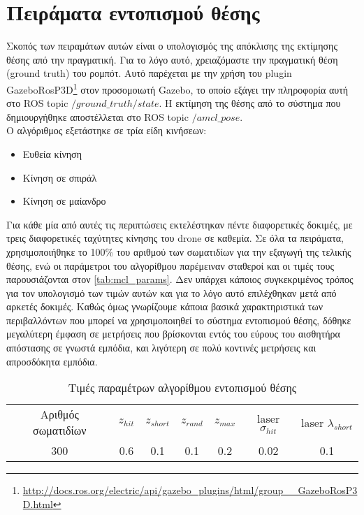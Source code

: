 \section{Πειράματα εντοπισμού θέσης}
\label{section:localization_tests}

Σκοπός των πειραμάτων αυτών είναι ο υπολογισμός της απόκλισης της εκτίμησης θέσης από την πραγματική. Για το λόγο αυτό, χρειαζόμαστε την πραγματική θέση (ground truth) του ρομπότ. Αυτό παρέχεται με την χρήση του plugin GazeboRosP3D\footnote{\href{http://docs.ros.org/electric/api/gazebo\_plugins/html/group\_\_GazeboRosP3D.html}{http://docs.ros.org/electric/api/gazebo\_plugins/html/group\_\_GazeboRosP3D.html}} στον προσομοιωτή Gazebo, το οποίο εξάγει την πληροφορία αυτή στο ROS topic $/ground\_truth/state$. Η εκτίμηση της θέσης από το σύστημα που δημιουργήθηκε αποστέλλεται στο ROS topic $/amcl\_pose$. \\
    
Ο αλγόριθμος εξετάστηκε σε τρία είδη κινήσεων:
\begin{itemize}
    \item {Ευθεία κίνηση}
    \item {Κίνηση σε σπιράλ}
    \item {Κίνηση σε μαίανδρο}
\end{itemize}

Για κάθε μία από αυτές τις περιπτώσεις εκτελέστηκαν πέντε διαφορετικές δοκιμές, με τρεις διαφορετικές ταχύτητες κίνησης του drone σε καθεμία. Σε όλα τα πειράματα, χρησιμοποιήθηκε το 100\% του αριθμού των σωματιδίων για την εξαγωγή της τελικής θέσης, ενώ οι παράμετροι του αλγορίθμου παρέμειναν σταθεροί και οι τιμές τους παρουσιάζονται στον \autoref{tab:mcl_params}. Δεν υπάρχει κάποιος συγκεκριμένος τρόπος για τον υπολογισμό των τιμών αυτών και για το λόγο αυτό επιλέχθηκαν μετά από αρκετές δοκιμές. Καθώς όμως γνωρίζουμε κάποια βασικά χαρακτηριστικά των περιβαλλόντων που μπορεί να χρησιμοποιηθεί το σύστημα εντοπισμού θέσης, δόθηκε μεγαλύτερη έμφαση σε μετρήσεις που βρίσκονται εντός του εύρους του αισθητήρα απόστασης σε γνωστά εμπόδια, και λιγότερη σε πολύ κοντινές μετρήσεις και απροσδόκητα εμπόδια.

\begin{table}[H]
    \begin{center}
        \caption{Τιμές παραμέτρων αλγορίθμου εντοπισμού θέσης}
        \label{tab:mcl_params}
        \begin{tabular}{| c | c | c | c | c | c | c |}
        \hline
        \rowcolor{Gray}
        Αριθμός σωματιδίων & $z_{hit}$ & $z_{short}$ & $z_{rand}$ & $z_{max}$ & laser $\sigma_{hit}$ & laser $\lambda_{short}$ \\
        300 & 0.6 & 0.1 & 0.1 & 0.2 & 0.02 & 0.1 \\
        \hline
        \end{tabular}
    \end{center}
\end{table}


